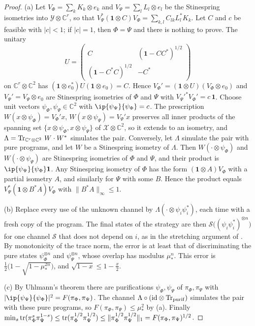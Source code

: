 \begin{proof}
(a) Let $V_\Phi=\sum_kK_k\otimes e_k$ and $V_\Psi=\sum_lL_l\otimes e_l$ be the Stinespring isometries into $\mathcal Y\otimes\mathbb C^r$, so that $V_\Psi^*(\mathbf 1\otimes C)V_\Phi=\sum_{k,l}C_{lk}L_l^*K_k$. Let $C$ and $c$ be feasible with $|c|<1$; if $|c|=1$, then $\Phi=\Psi$ and there is nothing to prove. The unitary
\[
U=\begin{pmatrix}C&(\mathbf 1-CC^*)^{1/2}\\(\mathbf 1-C^*C)^{1/2}&-C^*\end{pmatrix}
\]
on $\mathbb C^r\otimes\mathbb C^2$ has $(\mathbf 1\otimes e_0^*)U(\mathbf 1\otimes e_0)=C$. Hence $V_\Phi'=(\mathbf 1\otimes U)(V_\Phi\otimes e_0)$ and $V_\Psi'=V_\Psi\otimes e_0$ are Stinespring isometries of $\Phi$ and $\Psi$ with $V_\Psi'^*V_\Phi'=c\,\mathbf 1$. Choose unit vectors $\psi_\Phi,\psi_\Psi\in\mathbb C^2$ with $\ip{\psi_\Psi}{\psi_\Phi}=c$. The prescription $W(x\otimes\psi_\Phi)=V_\Phi'x$, $W(x\otimes\psi_\Psi)=V_\Psi'x$ preserves all inner products of the spanning set $\{x\otimes\psi_\Phi,x\otimes\psi_\Psi\}$ of $\mathcal X\otimes\mathbb C^2$, so it extends to an isometry, and $\Lambda=\operatorname{Tr}_{\mathbb C^r\otimes\mathbb C^2}\,W\cdot W^*$ simulates the pair. Conversely, let $\Lambda$ simulate the pair with pure programs, and let $W$ be a Stinespring isometry of $\Lambda$. Then $W(\cdot\otimes\psi_\Phi)$ and $W(\cdot\otimes\psi_\Psi)$ are Stinespring isometries of $\Phi$ and $\Psi$, and their product is $\ip{\psi_\Psi}{\psi_\Phi}\mathbf 1$. Any Stinespring isometry of $\Phi$ has the form $(\mathbf 1\otimes A)V_\Phi$ with a partial isometry $A$, and similarly for $\Psi$ with some $B$. Hence the product equals $V_\Psi^*(\mathbf 1\otimes B^*A)V_\Phi$ with $\|B^*A\|_\infty\le1$.

(b) Replace every use of the unknown channel by $\Lambda(\cdot\otimes\psi_i\psi_i^*)$, each time with a fresh copy of the program. The final states of the strategy are then $\mathcal S\big((\psi_i\psi_i^*)^{\otimes n}\big)$ for one channel $\mathcal S$ that does not depend on $i$, as in the stretching argument of \cite{Pirandola2019}. By monotonicity of the trace norm, the error is at least that of discriminating the pure states $\psi_\Phi^{\otimes n}$ and $\psi_\Psi^{\otimes n}$, whose overlap has modulus $\mu_*^n$. This error is $\tfrac12\big(1-\sqrt{1-\mu_*^{2n}}\big)$, and $\sqrt{1-x}\le1-\frac x2$.

(c) By Uhlmann's theorem \cite{Uhlmann1976} there are purifications $\psi_\Phi,\psi_\Psi$ of $\pi_\Phi,\pi_\Psi$ with $|\ip{\psi_\Psi}{\psi_\Phi}|^2=F(\pi_\Phi,\pi_\Psi)$. The channel $\Lambda\circ(\mathrm{id}\otimes\operatorname{Tr}_{\mathrm{purif}})$ simulates the pair with these pure programs, so $F(\pi_\Phi,\pi_\Psi)\le\mu_*^2$ by (a). Finally $\min_s\operatorname{tr}(\pi_\Phi^s\pi_\Psi^{1-s})\le\operatorname{tr}(\pi_\Phi^{1/2}\pi_\Psi^{1/2})\le\|\pi_\Phi^{1/2}\pi_\Psi^{1/2}\|_1=F(\pi_\Phi,\pi_\Psi)^{1/2}$.
\end{proof}

